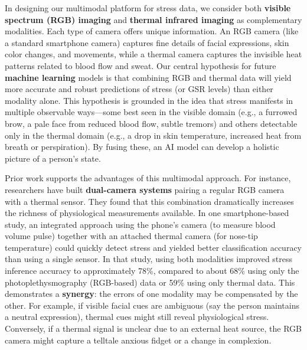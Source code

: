 In designing our multimodal platform for stress data, we consider both \textbf{visible spectrum (RGB) imaging} and \textbf{thermal infrared imaging} as complementary modalities. Each type of camera offers unique information. An RGB camera (like a standard smartphone camera) captures fine details of facial expressions, skin color changes, and movements, while a thermal camera captures the invisible heat patterns related to blood flow and sweat. Our central hypothesis for future \textbf{machine learning} models is that combining RGB and thermal data will yield more accurate and robust predictions of stress (or GSR levels) than either modality alone. This hypothesis is grounded in the idea that stress manifests in multiple observable ways—some best seen in the visible domain (e.g., a furrowed brow, a pale face from reduced blood flow, subtle tremors) and others detectable only in the thermal domain (e.g., a drop in skin temperature, increased heat from breath or perspiration). By fusing these, an AI model can develop a holistic picture of a person's state.

Prior work supports the advantages of this multimodal approach. For instance, researchers have built \textbf{dual-camera systems} pairing a regular RGB camera with a thermal sensor. They found that this combination dramatically increases the richness of physiological measurements available\cite{InstantStressSmartphone2019}. In one smartphone-based study, an integrated approach using the phone's camera (to measure blood volume pulse) together with an attached thermal camera (for nose-tip temperature) could quickly detect stress and yielded better classification accuracy than using a single sensor\cite{InstantStressSmartphone2019}. In that study, using both modalities improved stress inference accuracy to approximately 78\%, compared to about 68\% using only the photoplethysmography (RGB-based) data or 59\% using only thermal data\cite{InstantStressSmartphone2019}. This demonstrates a \textbf{synergy}: the errors of one modality may be compensated by the other. For example, if visible facial cues are ambiguous (say the person maintains a neutral expression), thermal cues might still reveal physiological stress. Conversely, if a thermal signal is unclear due to an external heat source, the RGB camera might capture a telltale anxious fidget or a change in complexion.

